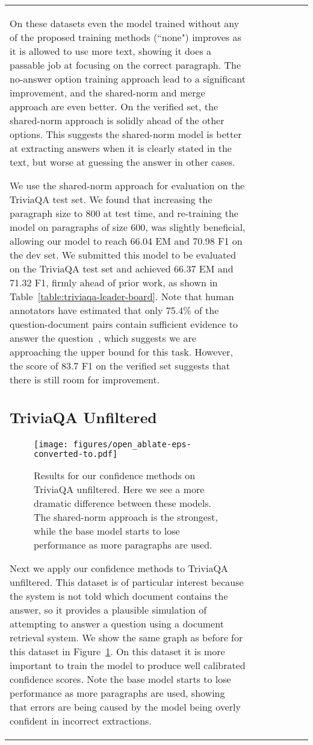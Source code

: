 \documentclass[11pt,a4paper]{article}
\begin{document}
\begin{table*}
\begin{small}
\begin{center}
\begin{tabular}{ | l | l | l | c | l | l | c |}
On these datasets even the model trained without any of the proposed training methods (``none") improves as it is allowed to use more text, showing it does a passable job at focusing on the correct paragraph. The no-answer option training approach lead to a significant improvement, and the shared-norm and merge approach are even better. On the verified set, the shared-norm approach is solidly ahead of the other options. This suggests the shared-norm model is better at extracting answers when it is clearly stated in the text, but worse at guessing the answer in other cases. 

We use the shared-norm approach for evaluation on the TriviaQA test set. We found that increasing the paragraph size to 800 at test time, and re-training the model on paragraphs of size 600, was slightly beneficial, allowing our model to reach 66.04 EM and 70.98 F1 on the dev set. We submitted this model to be evaluated on the TriviaQA test set and achieved 66.37 EM and 71.32 F1, firmly ahead of prior work, as shown in Table~\ref{table:triviaqa-leader-board}. Note that human annotators have estimated that only 75.4\% of the question-document pairs contain sufficient evidence to answer the question~\cite{triviaqa}, which suggests we are approaching the upper bound for this task. However, the score of 83.7 F1 on the verified set suggests that there is still room for improvement.

\subsection{TriviaQA Unfiltered}

\begin{figure}[!ht]
\texttt{[image: figures/open\_ablate-eps-converted-to.pdf]}
\caption{Results for our confidence methods on TriviaQA unfiltered. Here we see a more dramatic difference between these models. The shared-norm approach is the strongest, while the base model starts to lose performance as more paragraphs are used.}
\label{fig:open-results}
\end{figure}

Next we apply our confidence methods to TriviaQA unfiltered. 
This dataset is of particular interest because the system is not told which document contains the answer, so it provides a plausible simulation of attempting to answer a question using a document retrieval system.
We show the same graph as before for this dataset in Figure~\ref{fig:open-results}. On this dataset it is more important to train the model to produce well calibrated confidence scores. Note the base model starts to lose performance as more paragraphs are used, showing that errors are being caused by the model being overly confident in incorrect extractions. 


\end{tabular}
\end{center}
\end{small}
\end{table*}
\end{document}
